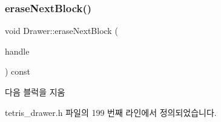 \subsubsection{\texorpdfstring{erase\+Next\+Block()}{eraseNextBlock()}}
{\footnotesize\ttfamily void Drawer\+::erase\+Next\+Block (\begin{DoxyParamCaption}\item[{const \mbox{\hyperlink{class_block_handler}{Block\+Handler}} \&}]{handle }\end{DoxyParamCaption}) const\hspace{0.3cm}{\ttfamily [inline]}}



다음 블럭을 지움 



tetris\+\_\+drawer.\+h 파일의 199 번째 라인에서 정의되었습니다.



